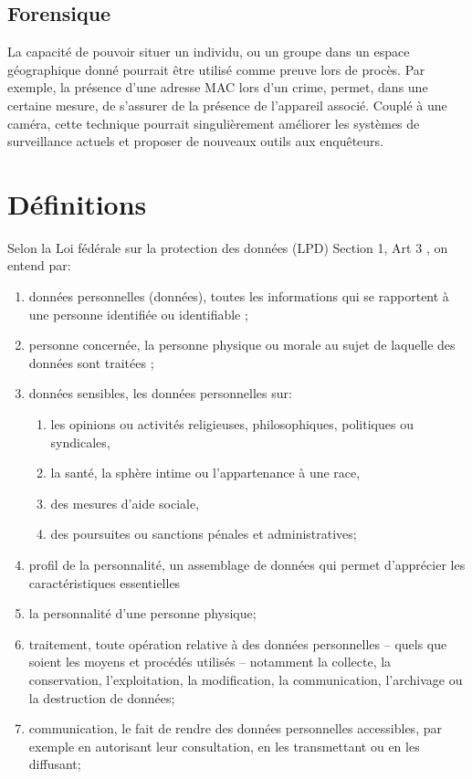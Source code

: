 \subsection{Forensique}
La capacité de pouvoir situer un individu, ou un groupe dans un espace géographique donné pourrait être utilisé
comme preuve lors de procès. Par exemple, la présence d’une adresse MAC lors d’un crime, permet, dans une certaine mesure, 
de s’assurer de la présence de l’appareil associé. Couplé à une caméra, cette technique pourrait
singulièrement améliorer les systèmes de surveillance actuels et proposer de nouveaux outils aux enquêteurs.

\section{Définitions}
Selon la Loi fédérale sur la protection des données (LPD) Section 1, Art 3
, on entend par:

\begin{enumerate}[label=\alph*]
\item données personnelles (données), toutes les informations qui se rapportent à une personne identifiée ou
identifiable ;
\item personne concernée, la personne physique ou morale au sujet de laquelle des données sont traitées ;
\item données sensibles, les données personnelles sur:
\begin{enumerate}[label=\alph*]
\item les opinions ou activités religieuses, philosophiques, politiques ou syndicales,
\item la santé, la sphère intime ou l’appartenance à une race,
\item des mesures d’aide sociale,
\item des poursuites ou sanctions pénales et administratives;
\end{enumerate}
\item profil de la personnalité, un assemblage de données qui permet d’apprécier les caractéristiques essentielles
\item la personnalité d’une personne physique;
\item traitement, toute opération relative à des données personnelles – quels que soient les moyens et procédés
utilisés – notamment la collecte, la conservation, l’exploitation, la modification, la communication,
l’archivage ou la destruction de données;
\item communication, le fait de rendre des données personnelles accessibles, par exemple en autorisant leur
consultation, en les transmettant ou en les diffusant;
\end{enumerate}

